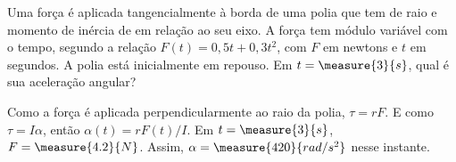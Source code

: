 \begin{question}
    Uma força é aplicada tangencialmente à borda de uma polia que tem  de raio e momento de inércia de  em relação ao seu eixo.
    A força tem módulo variável com o tempo, segundo a relação $F(t) = 0,5t + 0,3t^2$, com $F$ em newtons e $t$ em segundos.
    A polia está inicialmente em repouso.
    Em $t = \measure{3}{s}$, qual é sua aceleração angular?

    \begin{answer}
    \end{answer}
    
    \begin{solution}
      Como a força é aplicada perpendicularmente ao raio da polia, $\tau = rF$.
      E como $\tau = I\alpha$, então $\alpha(t) = rF(t)/I$.
      Em $t = \measure{3}{s}$, $F = \measure{4.2}{N}$.
      Assim, $\alpha = \measure{420}{rad/s^2}$ nesse instante.
    \end{solution}
\end{question}